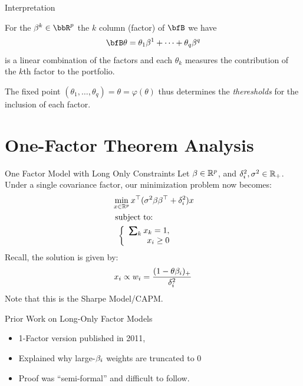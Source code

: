 \documentclass[11pt,leqno]{beamer}
\begin{document}
\begin{frame}{Interpretation}


For the $\beta^k \in \bbR^p$ the $k$ column 
(factor) of $\bfB$ we have
\begin{align}
  \bfB \theta =  \theta_1 \beta^1 + \cdots + \theta_q \beta^q
\end{align}
is a linear combination of the factors and
each $\theta_k$ measures the contribution of the $k$th factor
to the portfolio.

The fixed point $(\theta_1, \dots, \theta_q) = \theta 
= \varphi(\theta)$ thus determines the \emph{theresholds}
for the inclusion of each factor.




\end{frame}
\section{One-Factor Theorem Analysis}


\begin{frame}{One Factor Model with Long Only Constraints}
Let $\beta \in \mathbb{R}^p$, and $\delta_i^2, \sigma^2 \in \mathbb{R}_+$.  Under a single covariance factor, our minimization problem now becomes:
\begin{equation}
\begin{aligned}
 &\min_{x \in \bbr^p} x^\top (\gs^2 \gb \gb^\T  + \gd_i^2)x\\
  &\text{ subject to:} \\
  &\hspace{0.08in}\left\{
	\begin{array}{r}
	 \textstyle\sum\nolimits_k \hpt x_k =1 , \\
	 x_i \geq 0
	\end{array} 
\right. \label{con1}
\end{aligned}
\end{equation}
Recall, the solution is given by:
\begin{equation}
x_i \propto w_i =\frac{(1-\theta \beta_i)_+}{\delta_i^2}
\end{equation}
Note that this is the Sharpe Model/CAPM.
\end{frame}


\begin{frame}{Prior Work on Long-Only Factor Models}
\begin{itemize}

\item 1-Factor version  published in 2011,  \cite{clarke2011}
\item Explained why large-$\beta_i$ weights are truncated to $0$
\item Proof was ``semi-formal'' and difficult to follow.

\end{itemize}
\end{frame}
\end{document}
